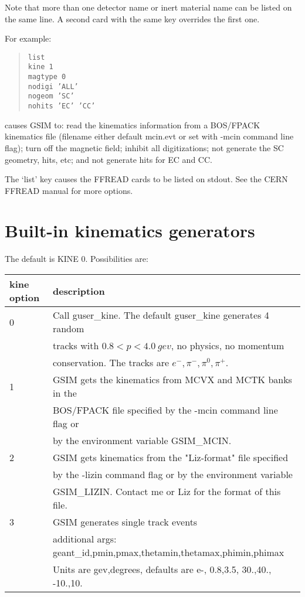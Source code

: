 \documentclass{article}
\begin{document}
\noindent
Note that more than one detector name or inert material name can be
listed on the same line.  A second card with the same key overrides
the first one.

For example:
\begin{quote}
{\tt list} \\
{\tt kine    1} \\
{\tt magtype 0} \\
{\tt nodigi 'ALL'} \\
{\tt nogeom 'SC'} \\
{\tt nohits 'EC' 'CC'}
\end{quote}
causes GSIM to: read the kinematics information from a BOS/FPACK
kinematics file (filename either default mcin.evt or set with -mcin
command line flag); turn off the magnetic field; inhibit all
digitizations; not generate the SC
geometry, hits, etc; and not generate hits for EC and CC.

The `list' key causes the FFREAD cards to be listed on stdout.  See
the CERN FFREAD manual for more options.


\newpage
\section{Built-in kinematics generators}
\label{kinematics}

The default is KINE 0.  Possibilities are:

\par
\begin{center}
\begin{tabular}{|l|l|} \hline
kine option  &  description \\ \hline
0 &  Call guser\_kine.  The default guser\_kine generates 4 random \\
  &  tracks with $0.8 < p < 4.0\ gev$, no physics, no momentum\\
  &  conservation.  The tracks are $e^-, \pi^-, \pi^0, \pi^+$. \\ \hline
1 &  GSIM gets the kinematics from MCVX and MCTK banks in the \\
  &  BOS/FPACK file specified by the -mcin command line flag or \\
  &  by the environment variable GSIM\_MCIN. \\ \hline
2 &  GSIM gets kinematics from the "Liz-format" file specified \\
  &  by the -lizin command flag or by the environment variable  \\
  &  GSIM\_LIZIN. Contact me or Liz for the format of this file. \\ \hline
3 &  GSIM generates single track events \\
  &  additional args:  geant\_id,pmin,pmax,thetamin,thetamax,phimin,phimax \\
  &  Units are gev,degrees, defaults are e-, 0.8,3.5, 30.,40., -10.,10. \\ \hline
\end{tabular}
\end{center}
\par
\end{document}
